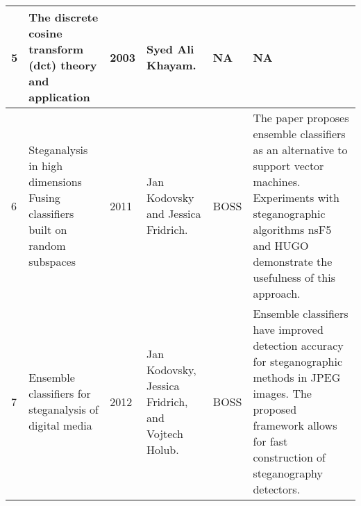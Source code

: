 \begin{table}[!h]
\begin{tabular}{|p{0.5cm}|p{3cm}|p{0.8cm}|p{2cm}|p{2cm}|p{4cm}|}
        5    & The discrete cosine transform (dct) theory and application                      & 2003 & Syed Ali   Khayam.                                                                     & NA               & NA                                                                                                                                                                                                \\\hline
        6    & Steganalysis in high dimensions Fusing classifiers built on random subspaces    & 2011 & Jan Kodovsky and Jessica Fridrich.                                                     & BOSS             & The paper proposes ensemble classifiers as an alternative   to support vector machines. Experiments with steganographic algorithms nsF5   and HUGO demonstrate the usefulness of this approach.   \\\hline
        7    & Ensemble classifiers for steganalysis of digital media                          & 2012 & Jan Kodovsky, Jessica Fridrich, and Vojtech Holub.                                     & BOSS             & Ensemble classifiers have improved detection accuracy for steganographic methods in JPEG images. The proposed framework allows for fast construction of steganography detectors.                  \\\hline
        \end{tabular}
\end{table}
\clearpage
